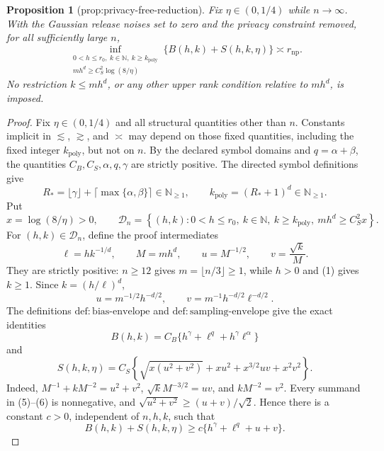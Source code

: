 \documentclass{article}
\newtheorem{proposition}{Proposition}
\begin{document}
\begin{proposition}[prop:privacy-free-reduction]\label{prop:privacy-free-reduction}
Fix \(\eta\in(0,1/4)\) while \(n\to\infty\).  With the Gaussian release noises set to zero and the privacy constraint removed, for all sufficiently large \(n\),
\[
 \inf_{\substack{0<h\le r_0,\ k\in\mathbb N,\ k\ge k_{\mathrm{poly}}\\
                  m h^d\ge C_S^2\log(8/\eta)}}
 \{B(h,k)+S(h,k,\eta)\}
 \asymp r_{\mathrm{np}}.
\]
No restriction \(k\le m h^d\), or any other upper rank condition relative to \(m h^d\), is imposed.
\end{proposition}
\begin{proof}
Fix \(\eta\in(0,1/4)\) and all structural quantities other than \(n\).  Constants implicit in \(\lesssim\), \(\gtrsim\), and \(\asymp\) may depend on those fixed quantities, including the fixed integer \(k_{\mathrm{poly}}\), but not on \(n\).  By the declared symbol domains and \(q=\alpha+\beta\), the quantities \(C_B,C_S,\alpha,q,\gamma\) are strictly positive.  The directed symbol definitions give
\[
 R_*=\lfloor\gamma\rfloor+\lceil\max\{\alpha,\beta\}\rceil\in\mathbb N_{\ge1},
 \qquad
 k_{\mathrm{poly}}=(R_*+1)^d\in\mathbb N_{\ge1}.
 \tag{1}
\]
Put
\[
 x=\log(8/\eta)>0,
 \qquad
 \mathcal D_n=\left\{(h,k):0<h\le r_0,\ k\in\mathbb N,\ k\ge k_{\mathrm{poly}},\ m h^d\ge C_S^2x\right\}.
 \tag{2}
\]
For \((h,k)\in\mathcal D_n\), define the proof intermediates
\[
 \ell=h k^{-1/d},\qquad M=m h^d,\qquad
 u=M^{-1/2},\qquad v=\frac{\sqrt{k}}{M}.
 \tag{3}
\]
They are strictly positive: \(n\ge12\) gives \(m=\lfloor n/3\rfloor\ge1\), while \(h>0\) and (1) gives \(k\ge1\).  Since \(k=(h/\ell)^d\),
\[
 u=m^{-1/2}h^{-d/2},
 \qquad
 v=m^{-1}h^{-d/2}\ell^{-d/2}.
 \tag{4}
\]
The definitions \(\mathrm{def{:}bias\text{-}envelope}\) and \(\mathrm{def{:}sampling\text{-}envelope}\) give the exact identities
\[
 B(h,k)=C_B\{h^\gamma+\ell^q+h^\gamma\ell^\alpha\}
 \tag{5}
\]
and
\[
 S(h,k,\eta)=C_S\left\{
 \sqrt{x(u^2+v^2)}+x u^2+x^{3/2}uv+x^2v^2
 \right\}.
 \tag{6}
\]
Indeed, \(M^{-1}+kM^{-2}=u^2+v^2\), \(\sqrt{k}M^{-3/2}=uv\), and \(kM^{-2}=v^2\).  Every summand in (5)--(6) is nonnegative, and \(\sqrt{u^2+v^2}\ge(u+v)/\sqrt2\).  Hence there is a constant \(c>0\), independent of \(n,h,k\), such that
\[
 B(h,k)+S(h,k,\eta)
 \ge c\{h^\gamma+\ell^q+u+v\}.
 \tag{7}
\]


\end{proof}
\end{document}

